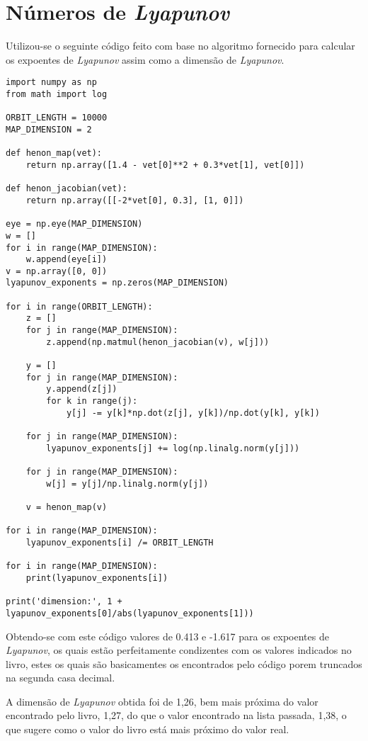 \documentclass{article}[twocolumn]
\begin{document}
	\section{N\'umeros de \textit{Lyapunov}}
	Utilizou-se o seguinte c\'odigo feito com base no algoritmo fornecido para
	calcular os expoentes de \textit{Lyapunov} assim como a dimens\~ao de \textit{Lyapunov}.
	\begin{verbatim}
import numpy as np
from math import log

ORBIT_LENGTH = 10000
MAP_DIMENSION = 2

def henon_map(vet):
    return np.array([1.4 - vet[0]**2 + 0.3*vet[1], vet[0]])

def henon_jacobian(vet):
    return np.array([[-2*vet[0], 0.3], [1, 0]])

eye = np.eye(MAP_DIMENSION)
w = []
for i in range(MAP_DIMENSION):
    w.append(eye[i])
v = np.array([0, 0])
lyapunov_exponents = np.zeros(MAP_DIMENSION)

for i in range(ORBIT_LENGTH):
    z = []
    for j in range(MAP_DIMENSION):
        z.append(np.matmul(henon_jacobian(v), w[j]))

    y = []
    for j in range(MAP_DIMENSION):
        y.append(z[j])
        for k in range(j):
            y[j] -= y[k]*np.dot(z[j], y[k])/np.dot(y[k], y[k])
	
    for j in range(MAP_DIMENSION):
        lyapunov_exponents[j] += log(np.linalg.norm(y[j]))

    for j in range(MAP_DIMENSION):
        w[j] = y[j]/np.linalg.norm(y[j])

    v = henon_map(v)

for i in range(MAP_DIMENSION):
    lyapunov_exponents[i] /= ORBIT_LENGTH

for i in range(MAP_DIMENSION):
    print(lyapunov_exponents[i])

print('dimension:', 1 + lyapunov_exponents[0]/abs(lyapunov_exponents[1]))

	\end{verbatim}
	Obtendo-se com este c\'odigo valores de 0.413 e -1.617 para os expoentes de
	\textit{Lyapunov}, os quais est\~ao perfeitamente condizentes com os valores indicados
	no livro, estes os quais s\~ao basicamentes os encontrados pelo c\'odigo porem truncados
	na segunda casa decimal.

	A dimens\~ao de \textit{Lyapunov} obtida foi de 1,26, bem mais pr\'oxima do valor
	encontrado pelo livro, 1,27, do que o valor encontrado na lista passada, 1,38, o que
	sugere como o valor do livro est\'a mais pr\'oximo do valor real.
\end{document}
